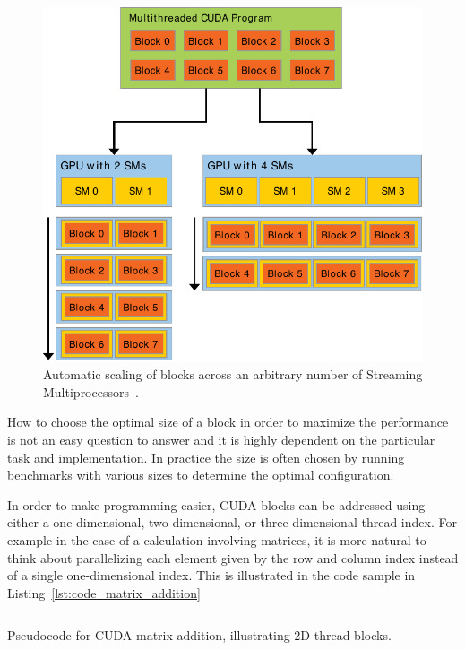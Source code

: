 \begin{figure}[!htbp]
  \centering
  \includegraphics[width=\textwidth]{img/automatic_scaling.pdf}
  \caption[Automatic scaling of blocks across an arbitrary number of Streaming Multiprocessors.]{Automatic scaling of blocks across an arbitrary number of Streaming Multiprocessors~\cite{CudaProgrammingGuide}.}
  \label{fig:automatic_scaling}
\end{figure}

How to choose the optimal size of a block in order to maximize the performance is not an easy question to answer and it is highly dependent on the particular task and implementation. In practice the size is often chosen by running benchmarks with various sizes to determine the optimal configuration.

In order to make programming easier, CUDA blocks can be addressed using either a one-dimensional, two-dimensional, or three-dimensional thread index. For example in the case of a calculation involving matrices, it is more natural to think about parallelizing each element given by the row and column index instead of a single one-dimensional index. This is illustrated in the code sample in Listing~\ref{lst:code_matrix_addition}

\begin{listing}[!htbp]
  \centering
  \inputminted[mathescape,
    linenos,
    numbersep=5pt,
    fontsize=\footnotesize,
    frame=lines,
    framesep=2mm]{c}{lst/cuda_matrix_add.lst}
  \caption{Pseudocode for CUDA matrix addition, illustrating 2D thread blocks.}
  \label{lst:code_matrix_addition}
\end{listing}

